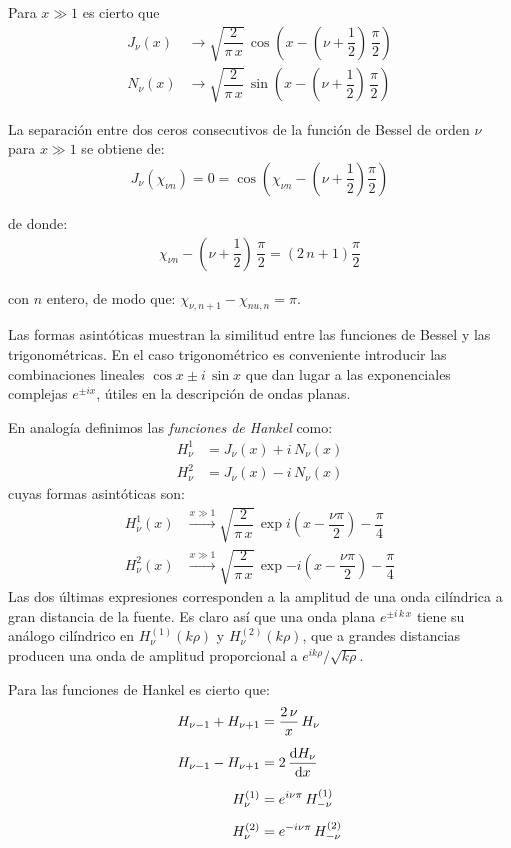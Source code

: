 Para $x \gg 1$ es cierto que
\begin{align*}
J_{\nu} (x) &\to \sqrt{\dfrac{2}{\pi \, x}} \, \cos \left( x - \left( \nu + \dfrac{1}{2} \right) \, \dfrac{\pi}{2} \right) \\[0.5em]
N_{\nu} (x) &\to \sqrt{\dfrac{2}{\pi \, x}} \, \sin \left( x - \left( \nu + \dfrac{1}{2} \right) \, \dfrac{\pi}{2} \right)
\end{align*}

La separación entre dos ceros consecutivos de la función de Bessel de orden $\nu$ para $x \gg 1$ se obtiene de:
\begin{align*}
J_{\nu}(\chi_{\nu n}) = 0 = \cos (\chi_{\nu n} - \left( \nu + \dfrac{1}{2} \right) \dfrac{\pi}{2})
\end{align*}

de donde:
\begin{align*}
\chi_{\nu n} - \left( \nu + \dfrac{1}{2} \right) \, \dfrac{\pi}{2} = (2 \, n + 1) \dfrac{\pi}{2}
\end{align*}

con $n$ entero, de modo que: $\chi_{\nu, n+1} - \chi_{nu,n} = \pi$.
\par
Las formas asintóticas muestran la similitud entre las funciones de Bessel y las trigonométricas. En el caso trigonométrico es conveniente introducir las combinaciones lineales $\cos x \pm i \, \sin x$ que dan lugar a las exponenciales complejas $e^{\pm i x}$, útiles en la descripción de ondas planas. 
\par
En analogía  definimos las \emph{funciones de Hankel} como:
\begin{align*}
H_{\nu}^{1} &= J_{\nu} (x) + i \, N_{\nu} (x) \\[0.5em]
H_{\nu}^{2} &= J_{\nu} (x) - i \, N_{\nu} (x)  
\end{align*}
cuyas formas asintóticas son:
\begin{align*}
H_{\nu}^{1}(x) & \xrightarrow{\text{$x \gg 1$}} \sqrt{\dfrac{2}{\pi \, x}} \, \exp{i \left( x - \dfrac{\nu \pi}{2}\right) - \dfrac{\pi}{4}} \\[0.75em]
H_{\nu}^{2}(x) & \xrightarrow{\text{$x \gg 1$}} \sqrt{\dfrac{2}{\pi \, x}} \, \exp{-i \left(x - \dfrac{\nu \pi}{2} \right) - \dfrac{\pi}{4}} 
\end{align*}
Las dos últimas expresiones corresponden a la amplitud de una onda cilíndrica a gran distancia de la fuente. Es claro así que una onda plana $e^{\pm i \, k \, x}$ tiene su análogo cilíndrico en $H_{\nu}^{(1)} (k \rho)$ y $H_{\nu}^{(2)} (k \rho)$, que a grandes distancias producen una onda de amplitud proporcional a $e^{i k \rho} / \sqrt{k \rho}$.
\par
Para las funciones de Hankel es cierto que:
\begin{align*}
H_{\nu-1} + H_{\nu+1} &= \dfrac{2 \, \nu}{x} \, H_{\nu} \\[0.5em]
H_{\nu-1} - H_{\nu+1} &= 2 \, \dv{H_{\nu}}{x} \\[0.5em]
H_{\nu}^{(1)} &= e^{i \nu \pi} \, H_{-\nu}^{(1)} \\[0.5em]
H_{\nu}^{(2)} &= e^{-i \nu \pi} \, H_{-\nu}^{(2)} 
\end{align*}

